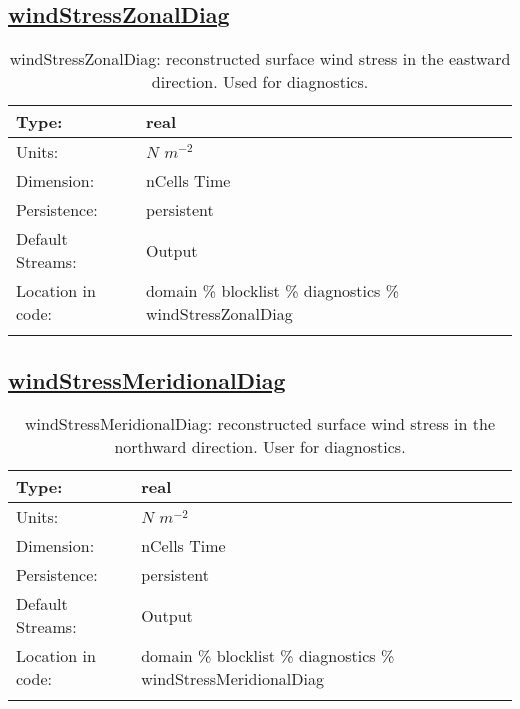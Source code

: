 \subsection[windStressZonalDiag]{\hyperref[sec:var_tab_diagnostics]{windStressZonalDiag}}
\label{subsec:var_sec_diagnostics_windStressZonalDiag}
\begin{center}
\begin{longtable}{| p{2.0in} | p{4.0in} |}
        \hline 
        Type: & real \\
        \hline 
        Units: & $N$ $m^{-2}$ \\
        \hline 
        Dimension: & nCells Time \\
        \hline 
        Persistence: & persistent \\
        \hline 
		 Default Streams: & Output  \\
        \hline 
		 Location in code: & domain \% blocklist \% diagnostics \% windStressZonalDiag \\
		 \hline 
    \caption{windStressZonalDiag: reconstructed surface wind stress in the eastward direction. Used for diagnostics.}
\end{longtable}
\end{center}
\subsection[windStressMeridionalDiag]{\hyperref[sec:var_tab_diagnostics]{windStressMeridionalDiag}}
\label{subsec:var_sec_diagnostics_windStressMeridionalDiag}
\begin{center}
\begin{longtable}{| p{2.0in} | p{4.0in} |}
        \hline 
        Type: & real \\
        \hline 
        Units: & $N$ $m^{-2}$ \\
        \hline 
        Dimension: & nCells Time \\
        \hline 
        Persistence: & persistent \\
        \hline 
		 Default Streams: & Output  \\
        \hline 
		 Location in code: & domain \% blocklist \% diagnostics \% windStressMeridionalDiag \\
		 \hline 
    \caption{windStressMeridionalDiag: reconstructed surface wind stress in the northward direction. User for diagnostics.}
\end{longtable}
\end{center}
